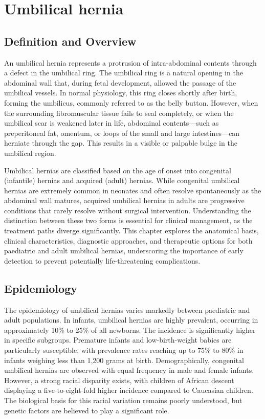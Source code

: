\chapter{Umbilical hernia}

\section*{Definition and Overview}
An umbilical hernia represents a protrusion of intra-abdominal contents through a defect in the umbilical ring. The umbilical ring is a natural opening in the abdominal wall that, during fetal development, allowed the passage of the umbilical vessels. In normal physiology, this ring closes shortly after birth, forming the umbilicus, commonly referred to as the belly button. However, when the surrounding fibromuscular tissue fails to seal completely, or when the umbilical scar is weakened later in life, abdominal contents---such as preperitoneal fat, omentum, or loops of the small and large intestines---can herniate through the gap. This results in a visible or palpable bulge in the umbilical region.

Umbilical hernias are classified based on the age of onset into congenital (infantile) hernias and acquired (adult) hernias. While congenital umbilical hernias are extremely common in neonates and often resolve spontaneously as the abdominal wall matures, acquired umbilical hernias in adults are progressive conditions that rarely resolve without surgical intervention. Understanding the distinction between these two forms is essential for clinical management, as the treatment paths diverge significantly. This chapter explores the anatomical basis, clinical characteristics, diagnostic approaches, and therapeutic options for both paediatric and adult umbilical hernias, underscoring the importance of early detection to prevent potentially life-threatening complications.

\section*{Epidemiology}
The epidemiology of umbilical hernias varies markedly between paediatric and adult populations.
In infants, umbilical hernias are highly prevalent, occurring in approximately 10\% to 25\% of all newborns. The incidence is significantly higher in specific subgroups. Premature infants and low-birth-weight babies are particularly susceptible, with prevalence rates reaching up to 75\% to 80\% in infants weighing less than 1,200 grams at birth. Demographically, congenital umbilical hernias are observed with equal frequency in male and female infants. However, a strong racial disparity exists, with children of African descent displaying a five-to-eight-fold higher incidence compared to Caucasian children. The biological basis for this racial variation remains poorly understood, but genetic factors are believed to play a significant role.

